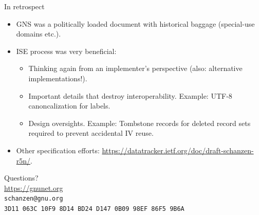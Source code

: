 \documentclass[aspectratio=169]{beamer}
\begin{document}
\begin{frame}{In retrospect}
  \begin{itemize}
  \item GNS was a politically loaded document with historical baggage (special-use domains etc.).
  \item ISE process was very beneficial:
    \begin{itemize}
    \item Thinking again from an implementer's perspective (also: alternative implementations!).
    \item Important details that destroy interoperability. Example: UTF-8 canoncalization for labels.
    \item Design oversights. Example: Tombstone records for deleted record sets required to prevent accidental IV reuse.
    \end{itemize}
  \item Other specification efforts: \url{https://datatracker.ietf.org/doc/draft-schanzen-r5n/}.
  \end{itemize}
\end{frame}


\begin{frame}
  \begin{center}
    Questions?\\
    \vspace{2cm}
    \url{https://gnunet.org}\\
    \vspace{1em}
    {\tiny
      \texttt{schanzen@gnu.org}\\
      \texttt{3D11~063C~10F9~8D14~BD24~D147~0B09~98EF~86F5~9B6A}\\
    }
  \end{center}
\end{frame}
\end{document}
